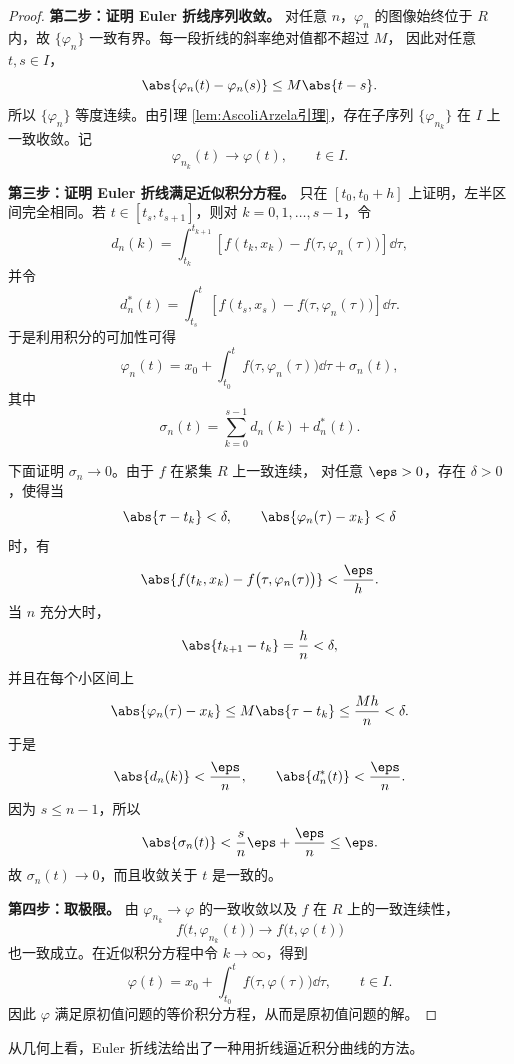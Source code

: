 \begin{proof}
	\noindent\textbf{第二步：证明 Euler 折线序列收敛。}\quad
	对任意 $n$，$\varphi_n$ 的图像始终位于 $R$ 内，故
	$\{\varphi_n\}$ 一致有界。每一段折线的斜率绝对值都不超过 $M$，
	因此对任意 $t,s\in I$，
	\[
		\abs{\varphi_n(t)-\varphi_n(s)}
		\leq M\abs{t-s}.
	\]
	所以 $\{\varphi_n\}$ 等度连续。由引理
	\ref{lem:AscoliArzela引理}，存在子序列
	$\{\varphi_{n_k}\}$ 在 $I$ 上一致收敛。记
	\[
		\varphi_{n_k}(t)\longrightarrow\varphi(t),
		\qquad t\in I.
	\]

	\noindent\textbf{第三步：证明 Euler 折线满足近似积分方程。}\quad
	只在 $[t_0,t_0+h]$ 上证明，左半区间完全相同。若
	$t\in[t_s,t_{s+1}]$，则对 $k=0,1,\ldots,s-1$，令
	\[
		d_n(k)
		=\int_{t_k}^{t_{k+1}}
		\left[
			f(t_k,x_k)-f\bigl(\tau,\varphi_n(\tau)\bigr)
		\right]\dd\tau,
	\]
	并令
	\[
		d_n^*(t)
		=\int_{t_s}^{t}
		\left[
			f(t_s,x_s)-f\bigl(\tau,\varphi_n(\tau)\bigr)
		\right]\dd\tau.
	\]
	于是利用积分的可加性可得
	\[
		\varphi_n(t)
		=x_0+\int_{t_0}^{t}
		f\bigl(\tau,\varphi_n(\tau)\bigr)\dd\tau
		+\sigma_n(t),
	\]
	其中
	\[
		\sigma_n(t)
		=\sum_{k=0}^{s-1}d_n(k)+d_n^*(t).
	\]

	下面证明 $\sigma_n\to0$。由于 $f$ 在紧集 $R$ 上一致连续，
	对任意 $\eps>0$，存在 $\delta>0$，使得当
	\[
		\abs{\tau-t_k}<\delta,
		\qquad
		\abs{\varphi_n(\tau)-x_k}<\delta
	\]
	时，有
	\[
		\abs{
			f(t_k,x_k)-f\bigl(\tau,\varphi_n(\tau)\bigr)
		}
		<\dfrac{\eps}{h}.
	\]
	当 $n$ 充分大时，
	\[
		\abs{t_{k+1}-t_k}
		=\dfrac{h}{n}<\delta,
	\]
	并且在每个小区间上
	\[
		\abs{\varphi_n(\tau)-x_k}
		\leq M\abs{\tau-t_k}
		\leq\dfrac{Mh}{n}<\delta.
	\]
	于是
	\[
		\abs{d_n(k)}<\dfrac{\eps}{n},
		\qquad
		\abs{d_n^*(t)}<\dfrac{\eps}{n}.
	\]
	因为 $s\leq n-1$，所以
	\[
		\abs{\sigma_n(t)}
		<\dfrac{s}{n}\eps+\dfrac{\eps}{n}
		\leq\eps.
	\]
	故 $\sigma_n(t)\to0$，而且收敛关于 $t$ 是一致的。

	\noindent\textbf{第四步：取极限。}\quad
	由 $\varphi_{n_k}\to\varphi$ 的一致收敛以及 $f$ 在 $R$ 上的一致连续性，
	\[
		f\bigl(t,\varphi_{n_k}(t)\bigr)
		\longrightarrow
		f\bigl(t,\varphi(t)\bigr)
	\]
	也一致成立。在近似积分方程中令 $k\to\infty$，得到
	\[
		\varphi(t)
		=x_0+\int_{t_0}^{t}
		f\bigl(\tau,\varphi(\tau)\bigr)\dd\tau,
		\qquad t\in I.
	\]
	因此 $\varphi$ 满足原初值问题的等价积分方程，从而是原初值问题的解。
\end{proof}

从几何上看，Euler 折线法给出了一种用折线逼近积分曲线的方法。

